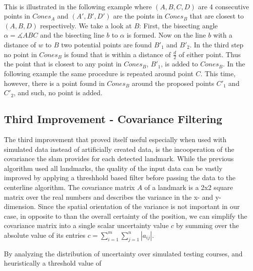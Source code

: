 \\This is illustrated in the following example where $(A,B,C,D)$ are 4 consecutive points in $Cones_A$ and $(A',B',D')$ are the points in $Cones_B$ that are closest to $(A,B,D)$ respectively.
We take a look at $B$: First, the bisecting angle $\alpha =\measuredangle  ABC$ and the bisecting line $b$ to $\alpha$ is formed. Now on the line $b$ with a distance of $w$ to $B$ two potential points are found $B'_1$ and $B'_2$. In the third step no point in $Cones_B$ is found that is within a distance of $\frac{d}{2}$ of either point. Thus the point that is closest to any point in $Cones_B$, $B'_1$, is added to $Cones_B$.
In the following example the same procedure is repeated around point $C$.
 This time, however, there is a point found in $Cones_B$ around the proposed points $C'_1$ and $C'_2$, and such, no point is added.
\subsection{Third Improvement - Covariance Filtering}
The third improvement that proved itself useful especially when used with simulated data instead of artificially created data, is the incooperation of the covariance the \ac{slam} provides for each detected landmark. While the previous algorithm used all landmarks, the quality of the input data can be vastly improved by applying a threshhold based filter before passing the data to the centerline algorithm. The covariance matrix $A$ of a landmark is a 2x2 square matrix over the real numbers and describes the variance in the x- and y-dimension. Since the spatial orientation of the variance is not important in our case, in opposite to than the overall certainty of the position, we can simplify the covariance matrix into a single scalar uncertainty value $c$ by summing over the absolute value of its entries $c = \sum_{i=1}^m \sum_{j=1}^n |a_{ij}|$.

By analyzing the distribution of uncertainty over simulated testing courses, and heuristically a threshold value of


